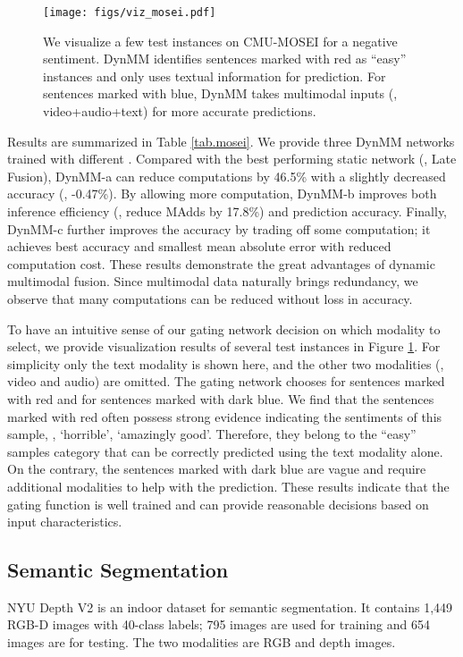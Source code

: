 \begin{figure}[!t]
  \centering
  \texttt{[image: figs/viz\_mosei.pdf]}
  \caption{We visualize a few test instances on CMU-MOSEI for a negative sentiment. DynMM identifies sentences marked with red as ``easy'' instances and only uses textual information for prediction. For sentences marked with blue, DynMM takes multimodal inputs (\ie, video+audio+text) for more accurate predictions. }
  \label{fig.viz_mosei}
\end{figure}

Results are summarized in Table \ref{tab.mosei}. We provide three DynMM networks trained with different . Compared with the best performing static network (\ie, Late Fusion), DynMM-a can reduce computations by 46.5\% with a slightly decreased accuracy (\ie, -0.47\%). By allowing more computation, DynMM-b improves both inference efficiency (\ie, reduce MAdds by 17.8\%) and prediction accuracy. Finally, DynMM-c further improves the accuracy by trading off some computation; it achieves best accuracy and smallest mean absolute error with reduced computation cost. These results demonstrate the great advantages of dynamic multimodal fusion. Since multimodal data naturally brings redundancy, we observe that many computations can be reduced without loss in accuracy. 


To have an intuitive sense of our gating network decision on which modality to select, we provide visualization results of several test instances in Figure \ref{fig.viz_mosei}. For simplicity only the text modality is shown here, and the other two modalities (\ie, video and audio) are omitted. The gating network chooses  for sentences marked with red and  for sentences marked with dark blue. We find that the sentences marked with red often possess strong evidence indicating the sentiments of this sample, \eg, `horrible', `amazingly good'. Therefore, they belong to the ``easy'' samples category that can be correctly predicted using the text modality alone. On the contrary, the sentences marked with dark blue are vague and require additional modalities to help with the prediction. These results indicate that the gating function is well trained and can provide reasonable decisions based on input characteristics.

\subsection{Semantic Segmentation}

NYU Depth V2 is an indoor dataset for semantic segmentation. It contains 1,449 RGB-D images with 40-class labels; 795 images are used for training and 654 images are for testing. The two modalities are RGB and depth images.     






